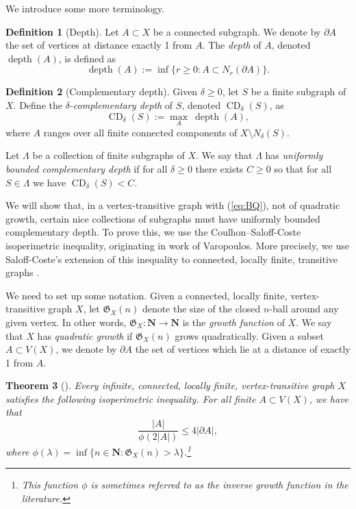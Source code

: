 \documentclass[11pt,a4paper]{amsart}
\newcommand{\N}{\mathbf{N}}
\newtheorem{theorem}{Theorem}[section]%
\theoremstyle{definition}
\newtheorem{definition}[theorem]{Definition}
\DeclareMathOperator{\depth}{depth}
\newcommand{\property}{(\ref{eq:BQ})}
\newcommand{\growth}{\mathfrak{G}}
\begin{document}
We introduce some more terminology. 

\begin{definition}[Depth]
    Let $A \subset X$ be a connected subgraph. We denote by $\partial A$ the set of vertices at distance exactly 1 from $A$. The \emph{depth} of $A$, denoted $\depth(A)$, is defined as 
    $$
    \depth(A) := \inf \{r \geq 0 : A \subset N_r(\partial A)\}.
    $$
\end{definition}

\begin{definition}[Complementary depth]
    Given $\delta \geq 0$, let $S$ be a finite subgraph of $X$. Define the \emph{$\delta$-complementary depth}  of $S$, denoted $\operatorname{CD}_\delta(S)$, as 
    $$
    \operatorname{CD}_\delta(S) := \max_A \ \depth(A),
    $$
    where $A$ ranges over all finite connected components of $X \setminus N_\delta(S)$. 
    
    Let $\Lambda$ be a collection of finite subgraphs of $X$.
    We say that $\Lambda$ has \emph{uniformly bounded complementary depth} if for all $\delta \geq 0$ there exists $C \geq 0$ so that for all $S \in \Lambda$ we have $\operatorname{CD}_\delta(S) < C$. 
\end{definition}


We will show that, in a vertex-transitive graph with \property{}, not of quadratic growth, certain nice collections of subgraphs must have uniformly bounded complementary depth.
To prove this, we use the Coulhon--Saloff-Coste isoperimetric inequality, originating in work of Varopoulos. More precisely, we use Saloff-Coste's extension of this inequality to connected, locally finite, transitive graphs \cite{CoulhonSaloffCoste1993,saloff1995isoperimetric}. 

We need to set up some notation. 
Given a connected, locally finite, vertex-transitive graph $X$, let $\growth_X(n)$ denote the size of the closed $n$-ball around any given vertex. In other words, $\growth_X : \N \to \N$ is the \textit{growth function} of $X$. 
We say that $X$ has \emph{quadratic growth} if $\growth_X(n)$ grows quadratically.
Given a subset $A \subset V(X)$, we denote by $\partial A$ the set of vertices which lie at a distance of exactly 1 from $A$. 

\begin{theorem}[{\cite[Thm.~2.1]{saloff1995isoperimetric}}]
	Every infinite, connected, locally finite, vertex-transitive graph $X$ satisfies the following isoperimetric inequality.
	For all finite  $A \subset V(X)$, we have that 
	$$
	\frac{|A|}{\phi(2|A|)} \leq 4|\partial A|,
	$$
	where $\phi(\lambda) = \inf\{n \in \N : \growth_X(n) > \lambda\}$.\footnote{This function $\phi$ is sometimes referred to as the \emph{inverse growth function} in the literature.} 
\end{theorem}
\end{document}
